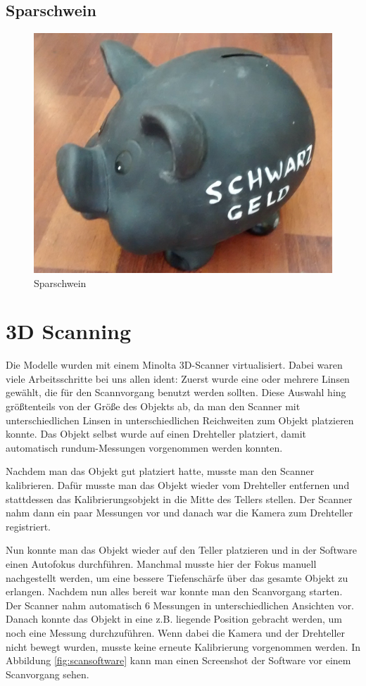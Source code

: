 \documentclass[]{article}
\begin{document}
\subsection{Sparschwein}
\begin{figure}[H]
\caption{Sparschwein}
\centering
\includegraphics[scale=0.25]{images/sparschwein/photo.jpg}
\end{figure}

\section{3D Scanning} %

Die Modelle wurden mit einem Minolta 3D-Scanner virtualisiert. Dabei waren viele Arbeitsschritte bei uns allen ident: Zuerst wurde eine oder mehrere Linsen gewählt, die für den Scannvorgang benutzt werden sollten. Diese Auswahl hing größtenteils von der Größe des Objekts ab, da man den Scanner mit unterschiedlichen Linsen in unterschiedlichen Reichweiten zum Objekt platzieren konnte. Das Objekt selbst wurde auf einen Drehteller platziert, damit automatisch rundum-Messungen vorgenommen werden konnten.

Nachdem man das Objekt gut platziert hatte, musste man den Scanner kalibrieren. Dafür musste man das Objekt wieder vom Drehteller entfernen und stattdessen das Kalibrierungsobjekt in die Mitte des Tellers stellen. Der Scanner nahm dann ein paar Messungen vor und danach war die Kamera zum Drehteller registriert.

Nun konnte man das Objekt wieder auf den Teller platzieren und in der Software einen Autofokus durchführen. Manchmal musste hier der Fokus manuell nachgestellt werden, um eine bessere Tiefenschärfe über das gesamte Objekt zu erlangen. Nachdem nun alles bereit war konnte man den Scanvorgang starten. Der Scanner nahm automatisch 6 Messungen in unterschiedlichen Ansichten vor. Danach konnte das Objekt in eine z.B. liegende Position gebracht werden, um noch eine Messung durchzuführen. Wenn dabei die Kamera und der Drehteller nicht bewegt wurden, musste keine erneute Kalibrierung vorgenommen werden. In Abbildung \ref{fig:scansoftware} kann man einen Screenshot der Software vor einem Scanvorgang sehen.
\end{document}
